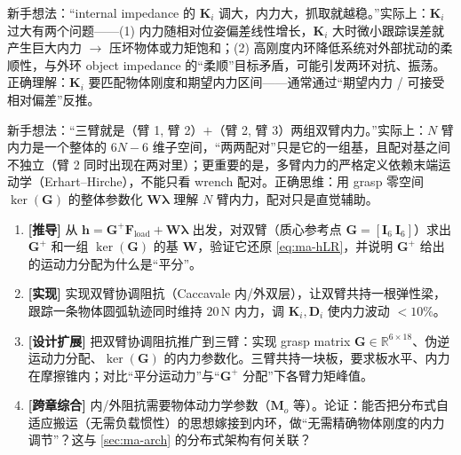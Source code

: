 \begin{pitfall}
新手想法：“internal impedance 的 $\mathbf{K}_i$ 调大，内力大，抓取就越稳。”实际上：$\mathbf{K}_i$ 过大有两个问题——(1) 内力随相对位姿偏差线性增长，$\mathbf{K}_i$ 大时微小跟踪误差就产生巨大内力 $\to$ 压坏物体或力矩饱和；(2) 高刚度内环降低系统对外部扰动的柔顺性，与外环 object impedance 的“柔顺”目标矛盾，可能引发两环对抗、振荡。正确理解：$\mathbf{K}_i$ 要匹配物体刚度和期望内力区间——通常通过“期望内力 / 可接受相对偏差”反推。
\end{pitfall}

\begin{pitfall}
新手想法：“三臂就是（臂 1, 臂 2）$+$（臂 2, 臂 3）两组双臂内力。”实际上：$N$ 臂内力是一个整体的 $6N-6$ 维子空间，“两两配对”只是它的一组基，且配对基之间不独立（臂 2 同时出现在两对里）；更重要的是，多臂内力的严格定义依赖末端运动学（Erhart--Hirche），不能只看 wrench 配对。正确思维：用 grasp 零空间 $\ker(\mathbf{G})$ 的整体参数化 $\mathbf{W}\boldsymbol{\lambda}$ 理解 $N$ 臂内力，配对只是直觉辅助。
\end{pitfall}

\begin{exercise}
\begin{enumerate}
  \item \textbf{[推导]} 从 $\mathbf{h}=\mathbf{G}^{+}\mathbf{F}_{\text{load}}+\mathbf{W}\boldsymbol{\lambda}$ 出发，对双臂（质心参考点 $\mathbf{G}=[\mathbf{I}_6\ \mathbf{I}_6]$）求出 $\mathbf{G}^{+}$ 和一组 $\ker(\mathbf{G})$ 的基 $\mathbf{W}$，验证它还原 \cref{eq:ma-hLR}，并说明 $\mathbf{G}^{+}$ 给出的运动力分配为什么是“平分”。
  \item \textbf{[实现]} 实现双臂协调阻抗（Caccavale 内/外双层），让双臂共持一根弹性梁，跟踪一条物体圆弧轨迹同时维持 $20$\,N 内力，调 $\mathbf{K}_i,\mathbf{D}_i$ 使内力波动 $<10\%$。
  \item \textbf{[设计扩展]} 把双臂协调阻抗推广到三臂：实现 grasp matrix $\mathbf{G}\in\mathbb{R}^{6\times18}$、伪逆运动力分配、$\ker(\mathbf{G})$ 的内力参数化。三臂共持一块板，要求板水平、内力在摩擦锥内；对比“平分运动力”与“$\mathbf{G}^{+}$ 分配”下各臂力矩峰值。
  \item \textbf{[跨章综合]} 内/外阻抗需要物体动力学参数（$\mathbf{M}_o$ 等）。论证：能否把分布式自适应搬运（无需负载惯性）的思想嫁接到内环，做“无需精确物体刚度的内力调节”？这与 \cref{sec:ma-arch} 的分布式架构有何关联？
\end{enumerate}
\end{exercise}

